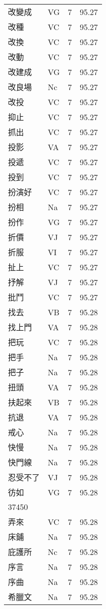 \documentclass[twocolumn]{book}
\begin{document}
\begin{supertabular}{llrr}
改變成 & VG & 7 &  95.27\\
改種 & VC & 7 &  95.27\\
改換 & VC & 7 &  95.27\\
改動 & VC & 7 &  95.27\\
改建成 & VG & 7 &  95.27\\
改良場 & Nc & 7 &  95.27\\
改投 & VC & 7 &  95.27\\
抑止 & VC & 7 &  95.27\\
抓出 & VC & 7 &  95.27\\
投影 & VA & 7 &  95.27\\
投遞 & VC & 7 &  95.27\\
投到 & VC & 7 &  95.27\\
扮演好 & VC & 7 &  95.27\\
扮相 & Na & 7 &  95.27\\
扮作 & VG & 7 &  95.27\\
折價 & VJ & 7 &  95.27\\
折服 & VI & 7 &  95.27\\
扯上 & VC & 7 &  95.27\\
抒解 & VJ & 7 &  95.27\\
批鬥 & VC & 7 &  95.27\\
找去 & VB & 7 &  95.28\\
找上門 & VA & 7 &  95.28\\
把玩 & VC & 7 &  95.28\\
把手 & Na & 7 &  95.28\\
把子 & Na & 7 &  95.28\\
扭頭 & VA & 7 &  95.28\\
扶起來 & VB & 7 &  95.28\\
抗退 & VA & 7 &  95.28\\
戒心 & Na & 7 &  95.28\\
快慢 & Na & 7 &  95.28\\
快門線 & Na & 7 &  95.28\\
忍受不了 & VJ & 7 &  95.28\\
彷如 & VG & 7 &  95.28\\
37450\\
弄來 & VC & 7 &  95.28\\
床鋪 & Na & 7 &  95.28\\
庇護所 & Nc & 7 &  95.28\\
序言 & Na & 7 &  95.28\\
序曲 & Na & 7 &  95.28\\
希臘文 & Na & 7 &  95.28\\

\end{supertabular}
\end{document}
